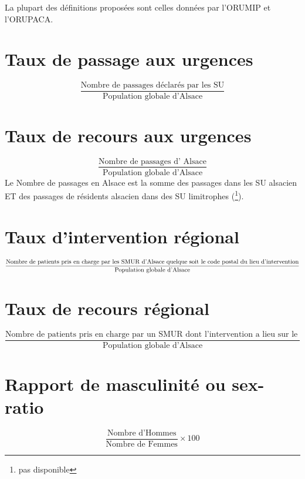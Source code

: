 \documentclass[12pt,english,french,twoside]{report}\usepackage[]{graphicx}\usepackage[]{color}
\begin{document}
La plupart des définitions proposées sont celles données par l'ORUMIP et l'ORUPACA.

\section*{Taux de passage aux urgences}
  \begin{displaymath}
    \frac{\text{Nombre de passages déclarés par les SU}}{\text{Population globale d'Alsace}}
  \end{displaymath}

\section*{Taux de recours aux urgences}
\begin{displaymath}
    \frac{\text{Nombre de passages d' Alsace}}{\text{Population globale d'Alsace}}
  \end{displaymath}
Le Nombre de passages en Alsace est la somme des passages dans les SU alsacien ET des passages de résidents alsacien dans des SU limitrophes (\footnote{pas disponible}).

\section*{Taux d'intervention régional}
\begin{displaymath}
    \frac{\text{Nombre de patients pris en charge par les SMUR d'Alsace}\linebreak[4] \text{ quelque soit le code postal du lieu d'intervention}}{\text{Population globale d'Alsace}}
  \end{displaymath}

\section*{Taux de recours régional}
\begin{displaymath}
    \frac{\text{Nombre de patients pris en charge par un SMUR dont l'intervention a lieu sur le territoire régional }}{\text{Population globale d'Alsace}}
  \end{displaymath}

\section*{Rapport de masculinité ou sex-ratio}
\begin{displaymath}
    \frac{\text{Nombre d'Hommes}}{\text{Nombre de Femmes}} \times 100
\end{displaymath}
\end{document}
